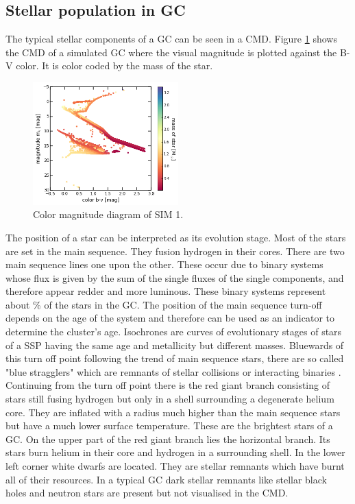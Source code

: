 \subsection{Stellar population in GC}\label{sec:cmd_theory}
The typical stellar components of a \ac{GC} can be seen in a \ac{CMD}. Figure \ref{fig:cmd} shows the \ac{CMD} of a simulated \ac{GC} where the visual magnitude is plotted against the B-V color. It is color coded by the mass of the star. 
\begin{figure}[htbp]
\centering
	\includegraphics[width=0.5\textwidth]{Plots/color_magnitude_diagram.png}
	\caption{Color magnitude diagram of SIM 1.}
	\label{fig:cmd}
\end{figure}
The position of a star can be interpreted as its evolution stage. Most of the stars are set in the main sequence. They fusion hydrogen in their cores. There are two main sequence lines one upon the other. These occur due to binary systems whose flux is given by the sum of the single fluxes of the single components, and therefore appear redder and more luminous. These binary systems represent about \unit[5]{\%} of the stars in the \ac{GC}. The position of the main sequence turn-off depends on the age of the system and therefore can be used as an indicator to determine the cluster's age. Isochrones are curves of evolutionary stages of stars of a \ac{SSP} having the same age and metallicity but different masses. Bluewards of this turn off point following the trend of main sequence stars, there are so called "blue stragglers" which are remnants of stellar collisions or interacting binaries \citep[p.628]{2008gady.book.....B}. Continuing from the turn off point there is the red giant branch consisting of stars still fusing hydrogen but only in a shell surrounding a degenerate helium core. They are inflated with a radius much higher than the main sequence stars but have a much lower surface temperature. These are the brightest stars of a \ac{GC}. On the upper part of the red giant branch lies the horizontal branch. Its stars burn helium in their core and hydrogen in a surrounding shell. In the lower left corner white dwarfs are located. They are stellar remnants which have burnt all of their resources. In a typical \ac{GC} dark stellar remnants like stellar black holes and neutron stars are present but not visualised in the \ac{CMD}. 
